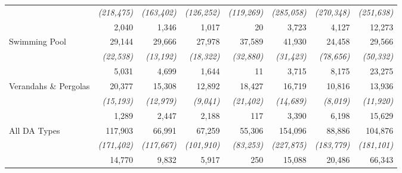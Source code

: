 \begin{table}[htbp]
{\begin{tabular}{rrrrrrrr}
          & \textit{  (218,475) } & \textit{   (163,402) } & \textit{   (126,252) } & \textit{   (119,269) } & \textit{   (285,058) } & \textit{   (270,348) } & \textit{   (251,638) } \\
            & 2,040 & 1,346 & 1,017 & 20    & 3,723 & 4,127 & 12,273 \\  
    \multicolumn{1}{l}{Swimming Pool} &         29,144  &         29,666  &         27,978  &         37,589  &         41,930  &         24,458  &          29,566  \\
          & \textit{     (22,538) } & \textit{     (13,192) } & \textit{     (18,322) } & \textit{     (32,880) } & \textit{     (31,423) } & \textit{     (78,656) } & \textit{      (50,332) } \\
         & 5,031 & 4,699 & 1,644 & 11    & 3,715 & 8,175 & 23,275 \\
    \multicolumn{1}{l}{Verandahs \& Pergolas} &         20,377  &         15,308  &         12,892  &         18,427  &         16,719  &         10,816  &          13,936  \\
          & \textit{     (15,193) } & \textit{     (12,979) } & \textit{       (9,041) } & \textit{     (21,402) } & \textit{     (14,689) } & \textit{       (8,019) } & \textit{      (11,920) } \\
          & 1,289 & 2,447 & 2,188 & 117   & 3,390 & 6,198 & 15,629 \\
    \multicolumn{1}{l}{All DA Types} &       117,903  &         66,991  &         67,259  &         55,306  &       154,096  &         88,886  &        104,876  \\
          & \textit{  (171,402) } & \textit{   (117,667) } & \textit{   (101,910) } & \textit{     (83,253) } & \textit{   (227,875) } & \textit{   (183,779) } & \textit{   (181,101) } \\
           & 14,770 & 9,832 & 5,917 & 250   & 15,088 & 20,486 & 66,343 \\
    \bottomrule
    \end{tabular}%
    }%
  \label{tab:DA_statistics_constant_dollar}%
\end{table}%
